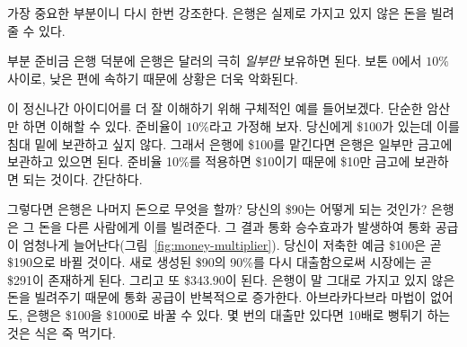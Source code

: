\begin{comment}
	Let me repeat the most important part: banks can lend money that they
	don't actually have.
\end{comment}
가장 중요한 부분이니 다시 한번 강조한다.
은행은 실제로 가지고 있지 않은 돈을 빌려줄 수 있다.

\begin{comment}
	Thanks to fractional reserve banking, a bank only has to keep a small
	\textit{fraction} of every dollar it gets. It's somewhere between $0$ and $10\%$,
	usually at the lower end, which makes things even worse.
\end{comment}
부분 준비금 은행 덕분에 은행은 달러의 극히 \textit{일부만} 보유하면 된다. 
보톤 $0$에서 $10\%$ 사이로, 낮은 편에 속하기 때문에 상황은 더욱 악화된다.

\begin{comment}
	Let's use a concrete example to better understand this crazy idea: A
	fraction of $10\%$ will do the trick and we should be able to do all the
	calculations in our head. Win-win. So, if you take \$100 to a
	bank --- because you don't want to store it under your mattress --- they
	only have to keep the agreed upon \textit{fraction} of it. In our example that
	would be \$10, because 10\% of \$100 is \$10. Easy, right?
\end{comment}
이 정신나간 아이디어를 더 잘 이해하기 위해 구체적인 예를 들어보겠다. 
단순한 암산만 하면 이해할 수 있다. 준비율이 $10\%$라고 가정해 보자.
당신에게 \$100가 있는데 이를 침대 밑에 보관하고 싶지 않다.
그래서 은행에 \$100를 맡긴다면 은행은 일부만 금고에 보관하고 있으면 된다.
준비율 10\%를 적용하면 \$10이기 때문에 \$10만 금고에 보관하면 되는 것이다.  
간단하다.

\begin{comment}
	So what do banks do with the rest of the money? What happens to your \$90? They
	do what banks do, they lend it to other people. The result is a money multiplier
	effect, which increases the money supply in the economy enormously
	(Figure~\ref{fig:money-multiplier}). Your initial deposit of \$100 will soon
	turn into \$190. By lending a 90\% fraction of the newly created \$90, there
	will soon be \$271 in the economy. And \$343.90 after that. The money supply is
	recursively increasing, since banks are literally lending money they don't
	have~\cite{wiki:money-multiplier}. Without a single Abracadabra, banks magically
	transform \$100 into one thousand dollars or more. Turns out 10x is easy. It
	only takes a couple of lending rounds.
\end{comment}
그렇다면 은행은 나머지 돈으로 무엇을 할까? 
당신의 \$90는 어떻게 되는 것인가? 
은행은 그 돈을 다른 사람에게 이를 빌려준다. 
그 결과 통화 승수효과가 발생하여 통화 공급이 엄청나게 늘어난다(그림~\ref{fig:money-multiplier}). 
당신이 저축한 예금 \$100은 곧 \$190으로 바뀔 것이다. 
새로 생성된 \$90의 90\%를 다시 대출함으로써 시장에는 곧 \$291이 존재하게 된다. 
그리고 또 \$343.90이 된다. 
은행이 말 그대로 가지고 있지 않은 돈을 빌려주기 때문에 통화 공급이 반복적으로 증가한다\cite{wiki:money-multiplier}. 
아브라카다브라 마법이 없어도, 은행은 \$100을 \$1000로 바꿀 수 있다. 
몇 번의 대출만 있다면 10배로 뻥튀기 하는 것은 식은 죽 먹기다.


